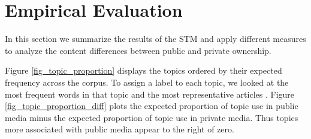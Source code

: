 \documentclass[12pt,a4paper,notitlepage]{article}
\begin{document}
\section{Empirical Evaluation}\label{ch_empirical}

In this section we summarize the results of the STM and apply different measures to analyze the content differences between public and private ownership. 

Figure \ref{fig_topic_proportion} displays the topics ordered by their expected frequency across the corpus. To assign a label to each topic, we looked at the most frequent words in that topic and the most representative articles \citep{roberts_model_2016}. Figure \ref{fig_topic_proportion_diff} plots the expected proportion of topic use in public media minus the expected proportion of topic use in private media. Thus topics more associated with public media appear to the right of zero.
\end{document}
